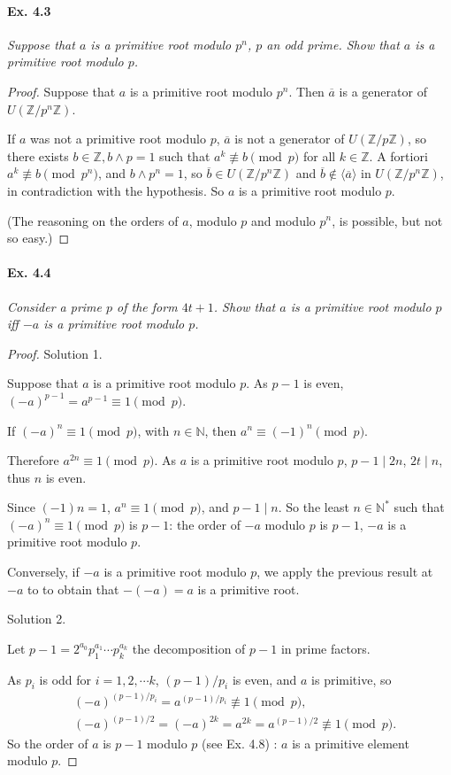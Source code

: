 \documentclass[11pt,a4paper]{article}
\newcommand{\Z}{\mathbb{Z}}
\newcommand{\N}{\mathbb{N}}
\begin{document}
\paragraph{Ex. 4.3}

{\it Suppose that $a$ is a primitive root modulo $p^n$, $p$ an odd prime. Show that $a$ is a primitive root modulo $p$.
}

\begin{proof}
Suppose that $a$ is a primitive root modulo $p^n$. Then $\overline{a}$ is a generator of $U(\Z/p^n\Z)$.

If $a$ was not a primitive root modulo $p$, $\overline{a}$ is not a generator of $U(\Z/p\Z)$, so there exists $b \in \Z, b \wedge p = 1$ such that $a^k \not \equiv b \pmod p$ for all $k\in \Z$. A fortiori $a^k \not \equiv b \pmod {p^n}$, and $b \wedge p^n = 1$, so $\overline{b} \in U(\Z/p^n\Z)$ and $\overline{b} \not \in \langle \overline{a} \rangle$ in $U(\Z/p^n\Z)$, in contradiction with the hypothesis. So $a$ is a primitive root modulo $p$.

(The reasoning on the orders of $a$, modulo $p$ and modulo $p^n$, is possible, but not so easy.)
\end{proof}

\paragraph{Ex. 4.4}

{\it 
Consider a prime $p$ of the form $4t + 1$. Show that $a$ is a primitive root modulo $p$ iff $-a$ is a primitive root modulo $p$.
}

\begin{proof} 
Solution 1.

Suppose that $a$ is a primitive root modulo $p$.
As $p-1$ is even, $(-a)^{p-1} = a^{p-1} \equiv 1 \pmod p$.

If $(-a)^n \equiv 1 \pmod p$, with $n \in \N$, then $a^n \equiv (-1)^n \pmod p$. 

Therefore $a^{2n} \equiv 1 \pmod p$. As $a$ is a primitive root modulo $p$, $p-1 \mid 2n$, $2t \mid n$, thus $n$ is even. 

Since $(-1)n = 1$, $a^n \equiv 1 \pmod p$,  and  $p-1 \mid n$. So the least $n\in \N^*$ such that $(-a)^n \equiv 1 \pmod p$ is $p-1$: the order of $-a$ modulo $p$ is $p-1$, $-a$ is a primitive root modulo $p$.

Conversely, if $-a$ is a primitive root modulo $p$, we apply the previous  result at $-a$ to to obtain that $-(-a) = a$ is a primitive root.
\bigskip

Solution 2.

Let $p-1 = 2^{a_0}p_1^{a_1}\cdots p_k^{a_k}$ the decomposition of $p-1$ in prime factors. 

 As $p_i$ is odd for $i=1,2,\cdots k$, $(p-1)/p_i$ is even, and $a$ is primitive, so 
 \begin{align*}
& (-a)^{(p-1)/p_i} = a^{(p-1)/p_i} \not \equiv 1 \pmod p,\\
&(-a)^{(p-1)/2}  = (-a)^{2k} = a^{2k} = a^{(p-1)/2} \not \equiv 1 \pmod p.
 \end{align*}
 So the order of $a$ is $p-1$ modulo $p$ (see Ex. 4.8) : $a$ is a primitive element modulo $p$.
\end{proof}
\end{document}
